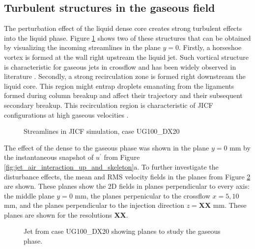\clearpage

\subsection{Turbulent structures in the gaseous field}
\label{ch5:subsec_turbulent_structures_in_gaseous_field}

The perturbation effect of the liquid dense core creates strong turbulent effects into the liquid phase. Figure \ref{fig:streamlines_UG100_DX20_from_dump} shows two of these structures that can be obtained by visualizing the incoming streamlines in the plane $y = 0$. Firstly, a horseshoe vortex is formed at the wall right upstream the liquid jet. Such vortical structure is characteristic for gaseous jets in crossflow and has been widely observed in literature . Secondly, a strong recirculation zone is formed right downstream the liquid core. This region might entrap droplets emanating from the ligaments formed during column breakup and affect their trajectory and their subsequent secondary breakup. This recirculation region is characteristic of JICF configurations at high gaseous velocities .

\begin{figure}[h!]
	\centering
	\vspace*{-0.5in}
	\caption{Streamlines in JICF simulation, case UG100\_DX20}
	\label{fig:streamlines_UG100_DX20_from_dump}
\end{figure}


The effect of the dense to the gaseous phase was shown in the plane $y = 0$ mm by the instantaneous snapshot of $u^{\prime}$ from Figure \ref{fig:jet_air_interaction_up_and_skeleton}a. To further investigate the disturbance effects, the mean and RMS velocity fields in the planes from Figure \ref{fig:jicf_sps_with_gaseous_planes} are shown. These planes show the 2D fields in planes perpendicular to every axis: the middle plane $y = 0$ mm, the planes perpenicular to the crossflow $x = 5, 10$ mm, and the planes perpendicular to the injection direction $z = $\textbf{XX} mm. These planes are shown for the resolutions \textbf{XX}.


\begin{figure}[h!]
	\centering
	\caption{Jet from case UG100\_DX20 showing planes to study the gaseous phase.}
	\label{fig:jicf_sps_with_gaseous_planes}
\end{figure}




